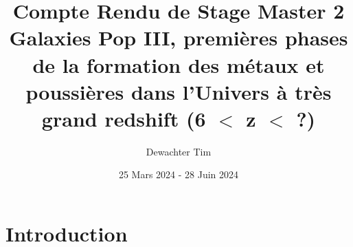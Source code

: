 \documentclass[11pt, a4paper]{article}
\title{\Huge Compte Rendu de Stage Master 2\\
\large Galaxies Pop III, premières phases de la formation des métaux et poussières dans l'Univers à très grand redshift (6 $<$ z $<$ ?)}
\author{Dewachter Tim}
\date{25 Mars 2024 - 28 Juin 2024}
\begin{document}
\maketitle

\newpage

\section{Introduction}
\end{document}
